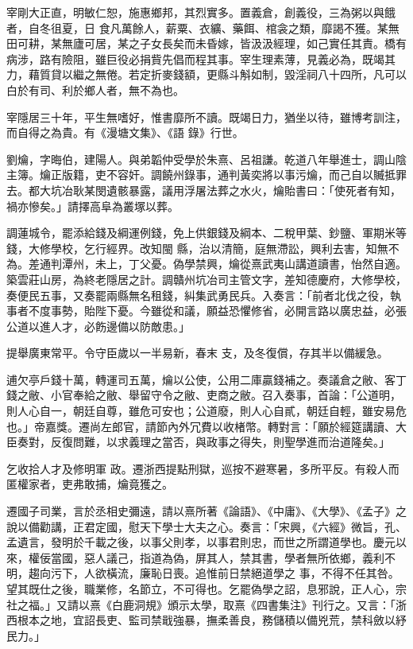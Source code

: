 \begin{pinyinscope}
 宰剛大正直，明敏仁恕，施惠鄉邦，其烈實多。置義倉，創義役，三為粥以與餓者，自冬徂夏，日
 食凡萬餘人，薪粟、衣纊、藥餌、棺衾之類，靡謁不獲。某無田可耕，某無廬可居，某之子女長矣而未昏嫁，皆汲汲經理，如己實任其責。橋有病涉，路有險阻，雖巨役必捐貲先倡而程其事。宰生理素薄，見義必為，既竭其力，藉質貸以繼之無倦。若定折麥錢額，更縣斗斛如制，毀淫祠八十四所，凡可以白於有司、利於鄉人者，無不為也。



 宰隱居三十年，平生無嗜好，惟書靡所不讀。既竭日力，猶坐以待，雖博考訓注，而自得之為貴。有《漫塘文集》、《語
 錄》行世。



 劉爚，字晦伯，建陽人。與弟韜仲受學於朱熹、呂祖謙。乾道八年舉進士，調山陰主簿。爚正版籍，吏不容奸。調饒州錄事，通判黃奕將以事污爚，而己自以贓抵罪去。都大坑冶耿某閔遺骸暴露，議用浮屠法葬之水火，爚貽書曰：「使死者有知，禍亦慘矣。」請擇高阜為叢塚以葬。



 調蓮城令，罷添給錢及綱運例錢，免上供銀錢及綱本、二稅甲葉、鈔鹽、軍期米等錢，大修學校，乞行經界。改知閩
 縣，治以清簡，庭無滯訟，興利去害，知無不為。差通判潭州，未上，丁父憂。偽學禁興，爚從熹武夷山講道讀書，怡然自適。築雲莊山房，為終老隱居之計。調贛州坑冶司主管文字，差知德慶府，大修學校，奏便民五事，又奏罷兩縣無名租錢，糾集武勇民兵。入奏言：「前者北伐之役，執事者不度事勢，貽陛下憂。今雖從和議，願益恐懼修省，必開言路以廣忠益，必張公道以進人才，必飭邊備以防敵患。」



 提舉廣東常平。令守臣歲以一半易新，春末
 支，及冬復償，存其半以備緩急。



 逋欠亭戶錢十萬，轉運司五萬，爚以公使，公用二庫贏錢補之。奏議倉之敝、客丁錢之敝、小官奉給之敝、舉留守令之敝、吏商之敝。召入奏事，首論：「公道明，則人心自一，朝廷自尊，雖危可安也；公道廢，則人心自貳，朝廷自輕，雖安易危也。」帝嘉獎。遷尚左郎官，請節內外冗費以收楮幣。轉對言：「願於經筵講讀、大臣奏對，反復問難，以求義理之當否，與政事之得失，則聖學進而治道隆矣。」



 乞收拾人才及修明軍
 政。遷浙西提點刑獄，巡按不避寒暑，多所平反。有殺人而匿權家者，吏弗敢捕，爚竟獲之。



 遷國子司業，言於丞相史彌遠，請以熹所著《論語》、《中庸》、《大學》、《孟子》之說以備勸講，正君定國，慰天下學士大夫之心。奏言：「宋興，《六經》微旨，孔、孟遺言，發明於千載之後，以事父則孝，以事君則忠，而世之所謂道學也。慶元以來，權佞當國，惡人議己，指道為偽，屏其人，禁其書，學者無所依鄉，義利不明，趨向污下，人欲橫流，廉恥日喪。追惟前日禁絕道學之
 事，不得不任其咎。望其既仕之後，職業修，名節立，不可得也。乞罷偽學之詔，息邪說，正人心，宗社之福。」又請以熹《白鹿洞規》頒示太學，取熹《四書集注》刊行之。又言：「浙西根本之地，宜詔長吏、監司禁戢強暴，撫柔善良，務儲積以備兇荒，禁科斂以紓民力。」




\end{pinyinscope}
